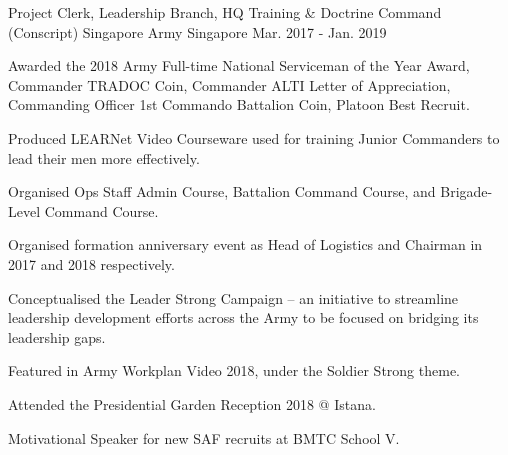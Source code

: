 

\begin{cventries}

  \cventry
    {Project Clerk, Leadership Branch, HQ Training \& Doctrine Command (Conscript)} %
    {Singapore Army} %
    {Singapore} %
    {Mar. 2017 - Jan. 2019} %
    {
      \begin{cvitems} %
        \item {Awarded the 2018 Army Full-time National Serviceman of the Year Award, Commander TRADOC Coin, Commander ALTI Letter of Appreciation, Commanding Officer 1st Commando Battalion Coin, Platoon Best Recruit.}
        \item {Produced LEARNet Video Courseware used for training Junior Commanders to lead their men more effectively.}
        \item {Organised Ops Staff Admin Course, Battalion Command Course, and Brigade-Level Command Course.}
        \item {Organised formation anniversary event as Head of Logistics and Chairman in 2017 and 2018 respectively.}
        \item {Conceptualised the Leader Strong Campaign – an initiative to streamline leadership development efforts across the Army to be focused on bridging its leadership gaps.}
        \item {Featured in Army Workplan Video 2018, under the Soldier Strong theme.}
        \item {Attended the Presidential Garden Reception 2018 @ Istana.}
        \item {Motivational Speaker for new SAF recruits at BMTC School V.}
      \end{cvitems}
    }


\end{cventries}

